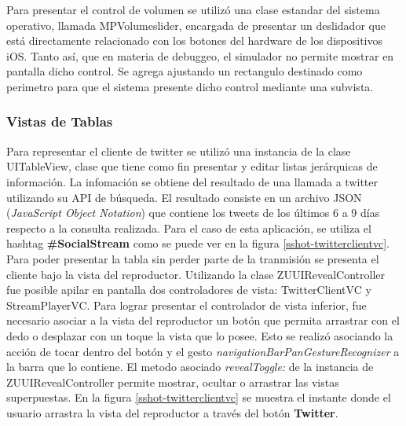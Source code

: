 		Para presentar el control de volumen se utilizó una clase estandar del sistema operativo, llamada MPVolumeslider, encargada de presentar un deslidador que está directamente relacionado con los botones del hardware de los dispositivos iOS. Tanto así, que en materia de debuggeo, el simulador no permite mostrar en pantalla dicho control. Se agrega ajustando un rectangulo destinado como perimetro para que el sistema presente dicho control mediante una subvista.
		
		\subsubsection{Vistas de Tablas}
Para representar el cliente de twitter se utilizó una instancia de la clase UITableView, clase que tiene como fin presentar y editar listas jerárquicas de información. La infomación se obtiene del resultado de una llamada a twitter utilizando su API de búsqueda. El resultado consiste en un archivo JSON (\textit{JavaScript Object Notation}) que contiene los tweets de los últimos 6 a 9 días respecto a la consulta realizada. Para el caso de esta aplicación, se utiliza el hashtag \textbf{\#SocialStream} como se puede ver en la figura \ref{sshot-twitterclientvc}.\\

Para poder presentar la tabla sin perder parte de la tranmisión se presenta el cliente bajo la vista del reproductor. Utilizando la clase ZUUIRevealController fue posible apilar en pantalla dos controladores de vista: TwitterClientVC y StreamPlayerVC. Para lograr presentar el controlador de vista inferior, fue necesario asociar a la vista del reproductor un botón que permita arrastrar con el dedo o desplazar con un toque la vista que lo posee. Esto se realizó asociando la acción de tocar dentro del botón y el gesto \textit{navigationBarPanGestureRecognizer} a la barra que lo contiene. El metodo asociado \textit{revealToggle:} de la instancia de ZUUIRevealController permite mostrar, ocultar o arrastrar las vistas superpuestas. En la figura \ref{sshot-twitterclientvc} se muestra el instante donde el usuario arrastra la vista del reproductor a través del botón \textbf{Twitter}.


